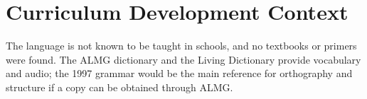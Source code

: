 \documentclass[12pt]{article}
\begin{document}
\section{Curriculum Development Context}
The language is not known to be taught in schools, and no textbooks or primers were found. The ALMG dictionary and the Living Dictionary provide vocabulary and audio; the 1997 grammar would be the main reference for orthography and structure if a copy can be obtained through ALMG.
\end{document}
